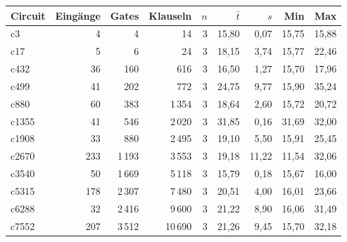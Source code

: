 \begin{tabular}{lrrrrrrrr}
\toprule
Circuit & Eingänge & Gates & Klauseln & $n$ & $\bar{t}$ & $s$ & Min & Max \\
\midrule
c3 & 4 & 4 & 14 & 3 & 15,80 & 0,07 & 15,75 & 15,88 \\
c17 & 5 & 6 & 24 & 3 & 18,15 & 3,74 & 15,77 & 22,46 \\
c432 & 36 & 160 & 616 & 3 & 16,50 & 1,27 & 15,70 & 17,96 \\
c499 & 41 & 202 & 772 & 3 & 24,75 & 9,77 & 15,90 & 35,24 \\
c880 & 60 & 383 & 1\,354 & 3 & 18,64 & 2,60 & 15,72 & 20,72 \\
c1355 & 41 & 546 & 2\,020 & 3 & 31,85 & 0,16 & 31,69 & 32,00 \\
c1908 & 33 & 880 & 2\,495 & 3 & 19,10 & 5,50 & 15,91 & 25,45 \\
c2670 & 233 & 1\,193 & 3\,553 & 3 & 19,18 & 11,22 & 11,54 & 32,06 \\
c3540 & 50 & 1\,669 & 5\,118 & 3 & 15,79 & 0,18 & 15,67 & 16,00 \\
c5315 & 178 & 2\,307 & 7\,480 & 3 & 20,51 & 4,00 & 16,01 & 23,66 \\
c6288 & 32 & 2\,416 & 9\,600 & 3 & 21,22 & 8,90 & 16,06 & 31,49 \\
c7552 & 207 & 3\,512 & 10\,690 & 3 & 21,26 & 9,45 & 15,70 & 32,18 \\
\bottomrule
\end{tabular}
